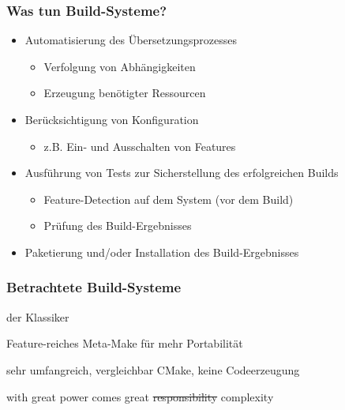 \begin{frame}
	\frametitle{Was tun Build-Systeme?}
	\begin{itemize}
		\pause
		\item Automatisierung des Übersetzungsprozesses
			\begin{itemize}
				\pause
				\item Verfolgung von Abhängigkeiten
				\pause
				\item Erzeugung benötigter Ressourcen
			\end{itemize}
		\pause
		\item Berücksichtigung von Konfiguration
			\begin{itemize}
			\pause
			\item z.B. Ein- und Ausschalten von Features
			\end{itemize}
		\pause
		\item Ausführung von Tests zur Sicherstellung des erfolgreichen Builds
		\begin{itemize}
			\pause
			\item Feature-Detection auf dem System (vor dem Build)
			\pause
			\item Prüfung des Build-Ergebnisses
		\end{itemize}
		\pause
		\item Paketierung und/oder Installation des Build-Ergebnisses
	\end{itemize}
\end{frame}

\begin{frame}
	\frametitle{Betrachtete Build-Systeme}
	\begin{description}
		\pause
		\item[GNU Make] der Klassiker
		\pause
		\item[CMake] Feature-reiches Meta-Make für mehr Portabilität
		\pause
		\item[omake] sehr umfangreich, vergleichbar CMake, keine Codeerzeugung
		\pause
		\item[GNU Autotools] with great power comes great \sout{responsibility} complexity
	\end{description}
\end{frame}
